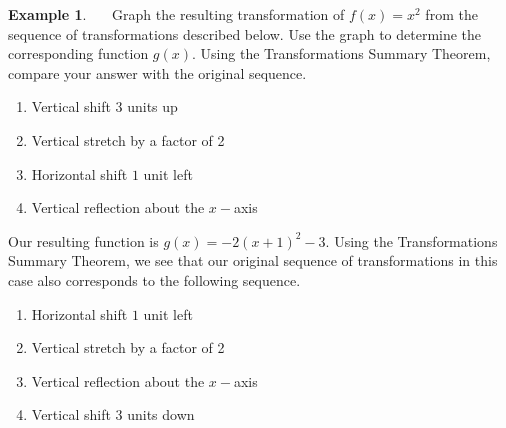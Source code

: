 \documentclass[12pt]{book}
\theoremstyle{definition}
\newtheorem{example}{Example}
\begin{document}
\begin{example}~~~Graph the resulting transformation of $f(x)=x^2$ from the sequence of transformations described below.  Use the graph to determine the corresponding function $g(x)$.  Using the Transformations Summary Theorem, compare your answer with the original sequence.
\begin{center}
\begin{enumerate}
	\item Vertical shift $3$ units up
	\item Vertical stretch by a factor of 2
	\item Horizontal shift $1$ unit left
	\item Vertical reflection about the $x-$axis
\end{enumerate}
\end{center}
\begin{center}
\end{center}
Our resulting function is $g(x)=-2(x+1)^2-3$.  Using the Transformations Summary Theorem, we see that our original sequence of transformations in this case also corresponds to the following sequence.
\begin{center}
\begin{enumerate}
	\item Horizontal shift $1$ unit left
	\item Vertical stretch by a factor of 2
	\item Vertical reflection about the $x-$axis
	\item Vertical shift $3$ units down
\end{enumerate}
\end{center}
\end{example}
\end{document}
